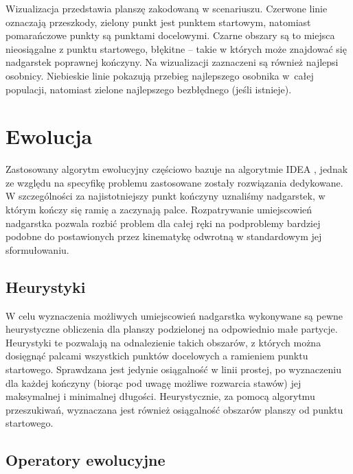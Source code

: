 \documentclass[11pt, leqno]{article}
\begin{document}
Wizualizacja przedstawia planszę zakodowaną w scenariuszu. Czerwone linie oznaczają przeszkody, zielony punkt jest punktem startowym, natomiast pomarańczowe punkty są punktami docelowymi. Czarne obszary są to miejsca nieosiągalne z punktu startowego, błękitne -- takie w których może znajdować się nadgarstek poprawnej kończyny. Na wizualizacji zaznaczeni są również najlepsi osobnicy. Niebieskie linie pokazują przebieg najlepszego osobnika w~całej populacji, natomiast zielone najlepszego bezbłędnego (jeśli istnieje).

\section{Ewolucja}
Zastosowany algorytm ewolucyjny częściowo bazuje na algorytmie IDEA \cite{PFI}, jednak ze względu na specyfikę problemu zastosowane zostały rozwiązania dedykowane. W szczególności za najistotniejszy punkt kończyny uznaliśmy nadgarstek, w którym kończy się ramię a zaczynają palce. Rozpatrywanie umiejscowień nadgarstka pozwala rozbić problem dla całej ręki na podproblemy bardziej podobne do postawionych przez kinematykę odwrotną w standardowym jej sformułowaniu. 

\subsection{Heurystyki}
W celu wyznaczenia możliwych umiejscowień nadgarstka wykonywane są pewne heurystyczne obliczenia dla planszy podzielonej na odpowiednio małe partycje. Heurystyki te pozwalają na odnalezienie takich obszarów, z których można dosięgnąć palcami wszystkich punktów docelowych a ramieniem punktu startowego. Sprawdzana jest jedynie osiągalność w linii prostej, po wyznaczeniu dla każdej kończyny (biorąc pod uwagę możliwe rozwarcia stawów) jej maksymalnej i minimalnej długości. Heurystycznie, za pomocą algorytmu przeszukiwań, wyznaczana jest również osiągalność obszarów planszy od punktu startowego.


\subsection{Operatory ewolucyjne}
\end{document}
